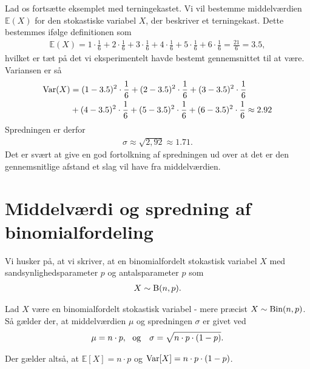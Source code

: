 \begin{exa}
Lad os fortsætte eksemplet med terningekastet. Vi vil bestemme middelværdien $\mathbb{E}(X)$ for den stokastiske variabel $X$, der beskriver et terningekast. Dette bestemmes ifølge definitionen som
\begin{align*}
\mathbb{E}(X) = 1\cdot \frac{1}{6} + 2\cdot \frac{1}{6}+3\cdot \frac{1}{6}+4\cdot \frac{1}{6}+5\cdot \frac{1}{6}+6\cdot \frac{1}{6} = \frac{21}{6} = 3.5,
\end{align*}
hvilket er tæt på det vi eksperimentelt havde bestemt gennemsnittet til at være. 
Variansen er så
\begin{align*}
\textnormal{Var}(X) &= (1-3.5)^2 \cdot \frac{1}{6} + (2-3.5)^2 \cdot \frac{1}{6} + (3-3.5)^2 \cdot \frac{1}{6}\\
 &+ (4-3.5)^2 \cdot \frac{1}{6} + (5-3.5)^2 \cdot \frac{1}{6} +(6-3.5)^2 \cdot \frac{1}{6} \approx 2.92
\end{align*}
Spredningen er derfor 
\begin{align*}
\sigma \approx \sqrt{2,92} \approx 1.71.
\end{align*}
Det er svært at give en god fortolkning af spredningen ud over at det er den gennemsnitlige afstand et slag vil have fra middelværdien. 
\end{exa}

\section*{Middelværdi og spredning af binomialfordeling}
Vi husker på, at vi skriver, at en binomialfordelt stokastisk variabel $X$ med sandsynlighedsparameter $p$ og antalsparameter $p$ som
\begin{align*}
X \sim \textnormal{B}(n,p).
\end{align*}

\begin{setn}
Lad $X$ være en binomialfordelt stokastisk variabel - mere præcist $X \sim \textnormal{Bin}(n,p)$. Så gælder der, at middelværdien $\mu$ og spredningen $\sigma$ er givet ved
\begin{align*}
 \mu &= n\cdot p,\ \textnormal{ og}
&\sigma = \sqrt{n\cdot p\cdot (1-p)}. 
\end{align*} 
\end{setn}
Der gælder altså, at $\mathbb{E}[X] = n\cdot p$ og $\textnormal{Var}[X] = n\cdot p\cdot (1-p)$. 

